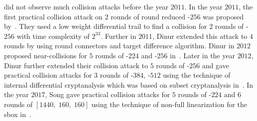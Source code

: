 \KECCAK{} did not observe much collision attacks before the year $2011$. In the year $2011$, the first practical collision attack on $2$ rounds of round reduced \KECCAK-$256$ was proposed by~\cite{naya2011practical}. They used a low weight differential trail to find a collision for $2$ rounds of \KECCAK-$256$ with time complexity of $2^{33}$. Further in $2011$, Dinur \etal extended this attack to $4$ rounds by using round connectors and target difference algorithm. Dinur \etal in $2012$ proposed near-collisions for $5$ rounds of \KECCAK-$224$ and \KECCAK-$256$ in~\cite{dinur2012new}. Later in the year $2012$, Dinur \etal further extended their collision attack to $5$ rounds of \KECCAK-$256$ and gave practical collision attacks for $3$ rounds of \KECCAK-$384$, \KECCAK-$512$ using the technique of internal differential cryptanalysis which was based on subset cryptanalysis in~\cite{dinur2013collision}. In the year $2017$, Song \etal gave practical collision attacks for $5$ rounds of \KECCAK-$224$ and $6$ rounds of \KECCAK$[1440,\; 160,\; 160]$ using the technique of non-full linearization for the \KECCAK{} sbox in~\cite{song2017non}.

